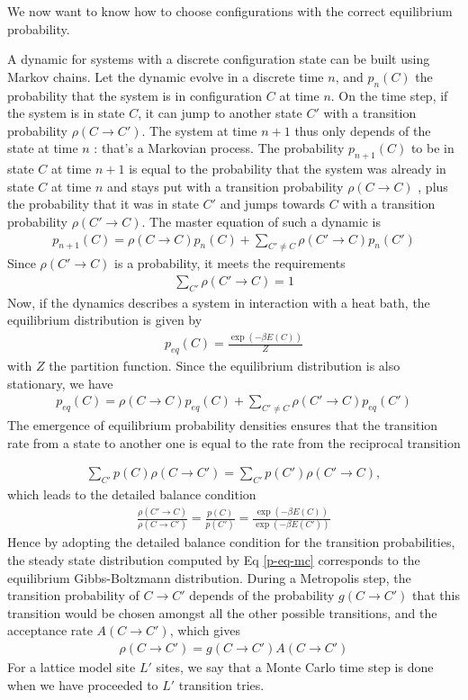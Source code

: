 We now want to know how to choose configurations with the correct  equilibrium probability.

A dynamic for systems with a discrete configuration state can be built using Markov chains. Let the dynamic evolve in a discrete time $n$, and $p_n(C)$ the probability that the system is in configuration $C$ at time $n$. On the time step, if the system is in state $C$, it can jump to another state $C'$ with a transition probability $\rho(C\to C')$. The system at time $n+1$ thus only depends of the state at time $n$ : that's a Markovian process. The probability $p_{n+1}(C)$ to be in state $C$ at time $n+1$ is equal to the probability that the system was already in state $C$ at time $n$ and stays put with a transition probability $\rho(C\to C)$ , plus the probability that it was in state $C'$ and jumps towards $C$ with a transition probability $\rho(C'\to C)$. The master equation of such a dynamic is
\begin{align}
p_{n+1}(C) = \rho(C\to C) p_n(C) + \sum_{C'\neq C} \rho(C'\to C) p_n(C')
\end{align}
Since $\rho(C' \to C)$ is a probability, it meets the requirements 
\begin{align}
\sum_{C'} \rho(C' \to C) = 1
\label{norm}
\end{align}
Now, if the dynamics describes a system in interaction with a heat bath, the equilibrium distribution is given by
\begin{align}
p_{eq}(C) = \frac{\exp(-\beta E(C))}{Z}
\end{align}
with $Z$ the partition function. Since the equilibrium distribution is also stationary, we have
\begin{align}
p_{eq}(C) = \rho(C\to C) p_{eq}(C) + \sum_{C'\neq C} \rho(C'\to C)p_{eq}(C')
\label{p-eq-mc}
\end{align}
The emergence of equilibrium probability densities ensures that the transition rate from a state to another one is equal to the rate from the reciprocal transition

\begin{align}
\sum_{C'} p(C) \rho(C \to C') = \sum_{C'} p(C') \rho(C' \to C),
\end{align}
which leads to the detailed balance condition \cite{newman_monte_1999} 
\begin{align}
\frac{\rho(C'\to C)}{\rho(C \to C')} = \frac{p(C)}{p(C')} = \frac{\exp(-\beta E(C))}{\exp(-\beta E(C'))}
\end{align} 
Hence by adopting the detailed balance condition for the transition probabilities, the steady state distribution computed by Eq \eqref{p-eq-mc} corresponds to the equilibrium Gibbs-Boltzmann distribution. 
During a Metropolis step, the transition probability of $C\to C'$ depends of the probability $g(C\to C')$ that this transition would be chosen amongst all the other possible transitions, and the acceptance rate ${A(C \to C')}$, which gives
\begin{align}
    \rho(C\to C') = g(C\to C') A(C \to C')
    \label{acceptance-mc}
\end{align}
For a lattice model site $L'$ sites, we say that a Monte Carlo time step is done when we have proceeded to $L'$ transition tries.
